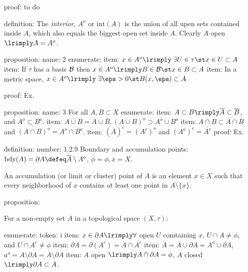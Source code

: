         proof:
            to do

    definition:
        The \emph{interior}, $A^o$ or $\textrm{int}(A)$ is the union of all upen sets contained inside $A$, which also equals the biggest open set inside $A$. Clearly $A$ open $\lrimply A = A^o$.

    proposition:
        name:
            2
        enumerate:
            item:
                $x \in A^o \lrimply \; \exists U \in \tau \st x \in U \subset A$
            item:
                If $\tau$ has a basis $\mathcal{B}$ then $x \in A^o \lrimply B \in \B \st x \in B \subset A$
            item:
                In a metric space, $x \in A^o \lrimply \; \exists \eps > 0 \st B(x, \eps) \subset A$

        proof:
            Ex.
    

    proposition:
        name:
            3
        For all $A, B \subset X$
        enumerate:
            item:
                $A \subset B \rimply \overline{A} \subset \overline{B}$, and $A^o \subset B^o$.
            item:
                $\overline{A \cup B} = \overline{A} \cup \overline{B}, ( A \cup B )^o \supset A^o \cup  B^o$
            item:
                $\overline{A \cap B} \subset \overline{A} \cap \overline{B}$ and $ (A \cap B)^o = A^o \cap B^o$.
            item:
                $(\overline{A})^c = (A^c)^o$ and $(A^o)^c = \overline{A^c}$
        proof:
            Ex.
    
    definition:
        number:
            1.2.9
        Boundary and accumulation points: $\textrm{bdy}(A) = \partial A \defeq \overline{A} \setminus A^o$, $\overline{\phi} = \phi, \overline{x} = X$.
        
        An accumulation (or limit or cluster) point of $A$ is an element $x \in X$ such that every neighborhood of $x$ contains at least one point in $A \setminus \{ x \}$.
        
    proposition:
        
        For a non-empty set $A$ in a topological space $(X, \tau)$:
        
        enumerate:
            token:
                i
            item:
                $x \in \partial A \lrimply \forall $ open $U$ comtaining $x$, $U \cap A \not = \phi$, and $U \cap A^c \not = \phi$
            item:
                $\partial A = \partial (A ^c) = \overline{A} \cap \overline{A^c}$
            item:
                $\overline{A} = A \cup \partial A = A^o \cup \partial A$, $a^o = A \setminus \partial A = \overline{A} \setminus \partial A$
            item:
                $A$ open $\lrimply A \cap \partial A = \phi$, $A$ closed $\lrimply \partial A \subset A$.
            

